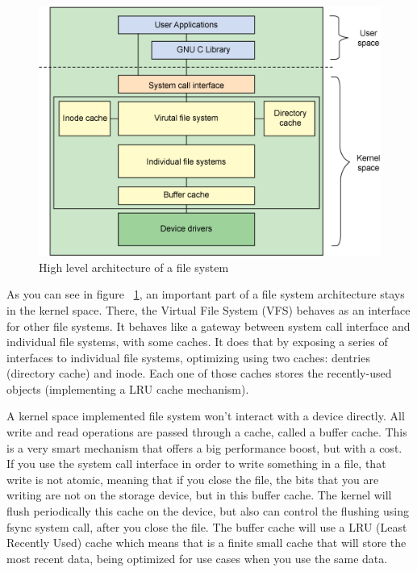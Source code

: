         \begin{figure}[h]
           \begin{center}
               \includegraphics[width=15cm]{theoretical/filesystem-arhitecture.png}
            \end{center}
            \caption{High level architecture of a file system \cite{FSA}}
            \label{fig:filesystem}
        \end{figure}

        As you can see in figure ~\ref{fig:filesystem}, an important part of a file system architecture stays in the kernel space. There, the Virtual File System (VFS) behaves as an interface for other file systems. It behaves like a gateway between system call interface and individual file systems, with some caches. It does that by exposing a series of interfaces to individual file systems, optimizing using two caches: dentries (directory cache) and inode. Each one of those caches stores the recently-used objects (implementing a LRU cache mechanism).
        
        A kernel space implemented file system won't interact with a device directly. All write and read operations are passed through a cache, called a buffer cache. This is a very smart mechanism that offers a big performance boost, but with a cost. If you use the system call interface in order to write something in a file, that write is not atomic, meaning that if you close the file, the bits that you are writing are not on the storage device, but in this buffer cache. The kernel will flush periodically this cache on the device, but also can control the flushing using fsync system call, after you close the file. The buffer cache will use a LRU (Least Recently Used) cache which means that is a finite small cache that will store the most recent data, being optimized for use cases when you use the same data. 
        
